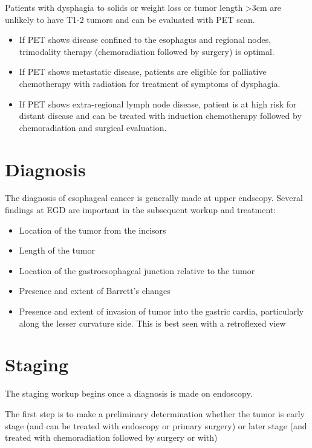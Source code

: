 \documentclass[
]{book}
\providecommand{\tightlist}{%
  \setlength{\itemsep}{0pt}\setlength{\parskip}{0pt}}
\begin{document}
Patients with dysphagia to solids or weight loss or tumor length \textgreater3cm are unlikely to have T1-2 tumors and can be evaluated with PET scan.

\begin{itemize}
\tightlist
\item
  If PET shows disease confined to the esophagus and regional nodes, trimodality therapy (chemoradiation followed by surgery) is optimal.
\item
  If PET shows metastatic disease, patients are eligible for palliative chemotherapy with radiation for treatment of symptoms of dysphagia.
\item
  If PET shows extra-regional lymph node disease, patient is at high risk for distant disease and can be treated with induction chemotherapy followed by chemoradiation and surgical evaluation.
\end{itemize}

\hypertarget{diagnosis}{%
\chapter{Diagnosis}\label{diagnosis}}

The diagnosis of esophageal cancer is generally made at upper endscopy. Several findings at EGD are important in the subsequent workup and treatment:

\begin{itemize}
\tightlist
\item
  Location of the tumor from the incisors
\item
  Length of the tumor
\item
  Location of the gastroesophageal junction relative to the tumor
\item
  Presence and extent of Barrett's changes
\item
  Presence and extent of invasion of tumor into the gastric cardia, particularly along the lesser curvature side. This is best seen with a retroflexed view
\end{itemize}

\hypertarget{staging}{%
\chapter{Staging}\label{staging}}

The staging workup begins once a diagnosis is made on endoscopy.

The first step is to make a preliminary determination whether the tumor is early stage (and can be treated with endoscopy or primary surgery) or later stage (and treated with chemoradiation followed by surgery or with)
\end{document}
